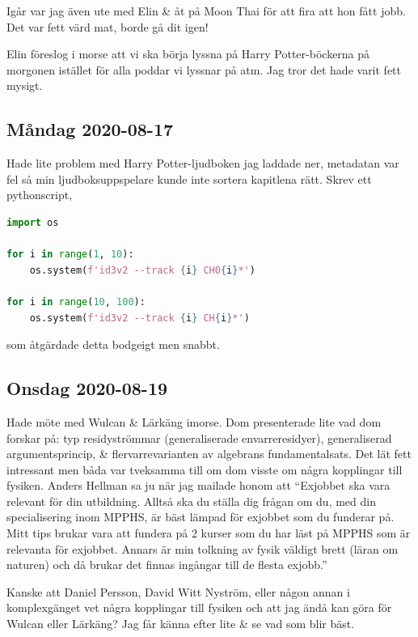 \bigskip

Igår var jag även ute med Elin \& åt på Moon Thai för att fira att hon fått jobb. Det var fett värd mat, borde gå dit igen!

\bigskip

Elin föreslog i morse att vi ska börja lyssna på Harry Potter-böckerna på morgonen istället för alla poddar vi lyssnar på atm. Jag tror det hade varit fett mysigt.


\subsection*{Måndag 2020-08-17}

Hade lite problem med Harry Potter-ljudboken jag laddade ner, metadatan var fel så min ljudboksuppspelare kunde inte sortera kapitlena rätt. Skrev ett pythonscript,
\begin{lstlisting}[language=python]
import os

for i in range(1, 10):
	os.system(f'id3v2 --track {i} CH0{i}*')

for i in range(10, 100):
	os.system(f'id3v2 --track {i} CH{i}*')
\end{lstlisting}
som åtgärdade detta bodgeigt men snabbt.


\subsection*{Onsdag 2020-08-19}

Hade möte med Wulcan \& Lärkäng imorse. Dom presenterade lite vad dom forskar på: typ residyströmmar (generaliserade envarreresidyer), generaliserad argumentsprincip, \& flervarrevarianten av algebrans fundamentalsats. Det lät fett intressant men båda var tveksamma till om dom visste om några kopplingar till fysiken. Anders Hellman sa ju när jag mailade honom att \enquote{Exjobbet ska vara relevant för din utbildning. Alltså ska du ställa dig frågan om du, med din specialisering inom MPPHS, är bäst lämpad för exjobbet som du funderar på. Mitt tips brukar vara att fundera på 2 kurser som du har läst på MPPHS som är relevanta för exjobbet. Annars är min tolkning av fysik väldigt brett (läran om naturen) och då brukar det finnas ingångar till de flesta exjobb.}

Kanske att Daniel Persson, David Witt Nyström, eller någon annan i komplexgänget vet några kopplingar till fysiken och att jag ändå kan göra för Wulcan eller Lärkäng? Jag får känna efter lite \& se vad som blir bäst.

